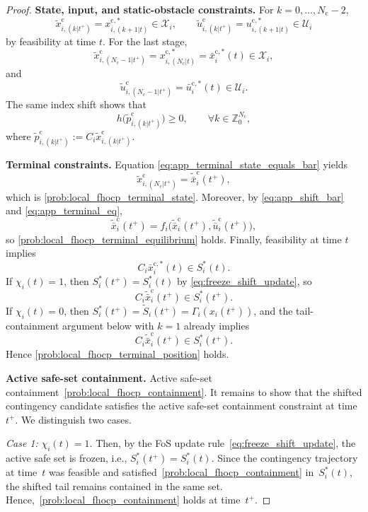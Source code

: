 \documentclass[twocolumn]{autart}
\begin{document}
\begin{proof}
\smallskip
\noindent\textbf{State, input, and static-obstacle constraints.}
For $k=0,\dots,N_{\mathrm c}-2$,
\[
\tilde x_{i,(k|t^+)}^{\mathrm c}
=
x_{i,(k+1|t)}^{\mathrm c,\ast}\in\mathcal X_i,
\qquad
\tilde u_{i,(k|t^+)}^{\mathrm c}
=
u_{i,(k+1|t)}^{\mathrm c,\ast}\in\mathcal U_i
\]
by feasibility at time $t$.
For the last stage,
\[
\tilde x_{i,(N_{\mathrm c}-1|t^+)}^{\mathrm c}
=
x_{i,(N_{\mathrm c}|t)}^{\mathrm c,\ast}
=
\bar x_i^{\mathrm c,\ast}(t)\in\mathcal X_i,
\]
and
\[
\tilde u_{i,(N_{\mathrm c}-1|t^+)}^{\mathrm c}
=
\bar u_i^{\mathrm c,\ast}(t)\in\mathcal U_i.
\]
The same index shift shows that
\[
h\bigl(\tilde p_{i,(k|t^+)}^{\mathrm c}\bigr)\ge 0,
\qquad \forall k\in\mathbb Z_0^{N_{\mathrm c}},
\]
where $\tilde p_{i,(k|t^+)}^{\mathrm c}:=C_i\tilde x_{i,(k|t^+)}^{\mathrm c}$.

\smallskip
\noindent\textbf{Terminal constraints.}
Equation \eqref{eq:app_terminal_state_equals_bar} yields
\[
\tilde x_{i,(N_{\mathrm c}|t^+)}^{\mathrm c}
=
\tilde{\bar x}_i^{\mathrm c}(t^+),
\]
which is \eqref{prob:local_fhocp_terminal_state}.
Moreover, by \eqref{eq:app_shift_bar} and \eqref{eq:app_terminal_eq},
\[
\tilde{\bar x}_i^{\mathrm c}(t^+)
=
f_i\!\bigl(\tilde{\bar x}_i^{\mathrm c}(t^+),\tilde{\bar u}_i^{\mathrm c}(t^+)\bigr),
\]
so \eqref{prob:local_fhocp_terminal_equilibrium} holds.
Finally, feasibility at time $t$ implies
\[
C_i\bar x_i^{\mathrm c,\ast}(t)\in S_i^\ast(t).
\]
If $\chi_i(t)=1$, then $S_i^\ast(t^+)=S_i^\ast(t)$ by \eqref{eq:freeze_shift_update}, so
\[
C_i\tilde{\bar x}_i^{\mathrm c}(t^+)\in S_i^\ast(t^+).
\]
If $\chi_i(t)=0$, then $S_i^\ast(t^+)=\tilde S_i(t^+)=\Gamma_i(x_i(t^+))$, and the tail-containment argument below with $k=1$ already implies
\[
C_i\tilde{\bar x}_i^{\mathrm c}(t^+)\in S_i^\ast(t^+).
\]
Hence \eqref{prob:local_fhocp_terminal_position} holds.

\smallskip
\noindent\textbf{Active safe-set containment.}
Active safe-set containment~\eqref{prob:local_fhocp_containment}.
It remains to show that the shifted contingency candidate satisfies the active safe-set containment constraint at time~$t^+$.
We distinguish two cases.

\emph{Case 1:} $\chi_i(t)=1$.
Then, by the FoS update rule~\eqref{eq:freeze_shift_update}, the active safe set is frozen, i.e.,
\(
S_i^\ast(t^+) = S_i^\ast(t).
\)
Since the contingency trajectory at time~$t$ was feasible and satisfied~\eqref{prob:local_fhocp_containment} in~$S_i^\ast(t)$, the shifted tail remains contained in the same set.
Hence,~\eqref{prob:local_fhocp_containment} holds at time~$t^+$.


\end{proof}
\end{document}
